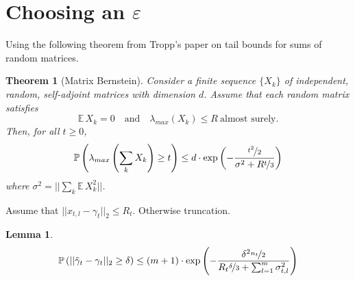 \documentclass[10pt,a4paper]{article}
\newtheorem{theorem}{Theorem}
\newtheorem{lemma}{Lemma}
\begin{document}
\section{Choosing an $\varepsilon$}
\label{sec:epsilon}

Using the following theorem from Tropp's paper \cite{tailbounds} on tail bounds for sums of random matrices.
\vspace{.5em}
\begin{theorem}[Matrix Bernstein]
  \label{thm:matrix-bernstein}
  Consider a finite sequence $\{ X_{k} \}$ of independent, random, self-adjoint matrices with dimension $d$.
  Assume that each random matrix satisfies
  \begin{equation*}
    \mathbb{E}\,X_{k} = 0 \quad \text{and} \quad \lambda_{max}(X_{k}) \le R\ \text{almost surely.}
  \end{equation*}
  Then, for all $t \ge 0$,
  \begin{equation*}
    \mathbb{P}\left( \lambda_{max}\left( \sum_{k} X_{k} \right) \ge t \right) \le d \cdot \exp\left( -\frac{\nicefrac{t^{2}}{2}}{\sigma^{2} + R \nicefrac{t}{3}} \right)
  \end{equation*}
  where $\sigma^{2} = ||\sum_{k} \mathbb{E}\,X_{k}^{2}||$.
\end{theorem}

Assume that $||x_{t, l} - \gamma_{t}||_{2} \le R_{t}$.
Otherwise truncation.

\vspace{.5em}
\begin{lemma}
  \begin{equation*}
    \mathbb{P}\left( ||\tilde{\gamma}_{t} - \gamma_{t}||_{2} \ge \delta \right) \le (m + 1) \cdot \exp\left( -\frac{\delta^{2} \nicefrac{n_{t}}{2}}{R_{t} \nicefrac{\delta}{3} + \sum_{l = 1}^{m} \sigma_{t, l}^{2}} \right)
  \end{equation*}
\end{lemma}
\end{document}
